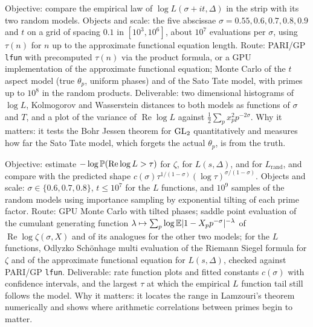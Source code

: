 \begin{compproblem}
Objective: compare the empirical law of $\log L(\sigma+it,\Delta)$ in the strip with its two random models. Objects and scale: the five abscissae $\sigma = 0.55,0.6,0.7,0.8,0.9$ and $t$ on a grid of spacing $0.1$ in $[10^3,10^6]$, about $10^7$ evaluations per $\sigma$, using $\tau(n)$ for $n$ up to the approximate functional equation length. Route: PARI/GP \texttt{lfun} with precomputed $\tau(n)$ via the product formula, or a GPU implementation of the approximate functional equation; Monte Carlo of the $t$ aspect model (true $\theta_p$, uniform phases) and of the Sato Tate model, with primes up to $10^8$ in the random products. Deliverable: two dimensional histograms of $\log L$, Kolmogorov and Wasserstein distances to both models as functions of $\sigma$ and $T$, and a plot of the variance of $\operatorname{Re}\log L$ against $\frac12\sum_px_p^2p^{-2\sigma}$. Why it matters: it tests the Bohr Jessen theorem for $\mathrm{GL}_2$ quantitatively and measures how far the Sato Tate model, which forgets the actual $\theta_p$, is from the truth.
\end{compproblem}

\begin{compproblem}
Objective: estimate $-\log\mathbb{P}(\operatorname{Re}\log L>\tau)$ for $\zeta$, for $L(s,\Delta)$, and for $L_{\mathrm{rand}}$, and compare with the predicted shape $c(\sigma)\tau^{1/(1-\sigma)}(\log\tau)^{\sigma/(1-\sigma)}$. Objects and scale: $\sigma\in\{0.6,0.7,0.8\}$, $t\le10^7$ for the $L$ functions, and $10^9$ samples of the random models using importance sampling by exponential tilting of each prime factor. Route: GPU Monte Carlo with tilted phases; saddle point evaluation of the cumulant generating function $\lambda\mapsto\sum_p\log\mathbb{E}|1-X_pp^{-\sigma}|^{-\lambda}$ of $\operatorname{Re}\log\zeta(\sigma,X)$ and of its analogues for the other two models; for the $L$ functions, Odlyzko Sch\"onhage multi evaluation of the Riemann Siegel formula for $\zeta$ and of the approximate functional equation for $L(s,\Delta)$, checked against PARI/GP \texttt{lfun}. Deliverable: rate function plots and fitted constants $c(\sigma)$ with confidence intervals, and the largest $\tau$ at which the empirical $L$ function tail still follows the model. Why it matters: it locates the range in Lamzouri's theorem numerically and shows where arithmetic correlations between primes begin to matter.
\end{compproblem}

